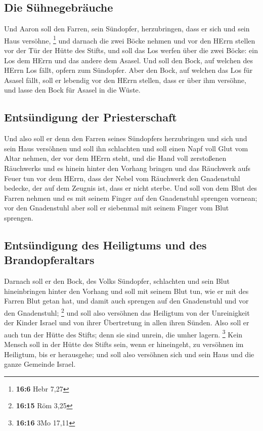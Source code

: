 \hypertarget{die-suxfchnegebruxe4uche}{%
\subsection{Die Sühnegebräuche}\label{die-suxfchnegebruxe4uche}}

 Und Aaron soll den Farren, sein Sündopfer, herzubringen,
dass er sich und sein Haus versöhne, \footnote{\textbf{16:6} Hebr 7,27}
 und darnach die zwei Böcke nehmen und vor den HErrn
stellen vor der Tür der Hütte des Stifts,  und soll das
Los werfen über die zwei Böcke: ein Los dem HErrn und das andere dem
Asasel.  Und soll den Bock, auf welchen des HErrn Los
fällt, opfern zum Sündopfer.  Aber den Bock, auf welchen
das Los für Asasel fällt, soll er lebendig vor den HErrn stellen, dass
er über ihm versöhne, und lasse den Bock für Asasel in die Wüste.

\hypertarget{entsuxfcndigung-der-priesterschaft}{%
\subsection{Entsündigung der
Priesterschaft}\label{entsuxfcndigung-der-priesterschaft}}

 Und also soll er denn den Farren seines Sündopfers
herzubringen und sich und sein Haus versöhnen und soll ihn schlachten
 und soll einen Napf voll Glut vom Altar nehmen, der vor
dem HErrn steht, und die Hand voll zerstoßenen Räuchwerks und es hinein
hinter den Vorhang bringen  und das Räuchwerk aufs Feuer
tun vor dem HErrn, dass der Nebel vom Räuchwerk den Gnadenstuhl bedecke,
der auf dem Zeugnis ist, dass er nicht sterbe.  Und soll
von dem Blut des Farren nehmen und es mit seinem Finger auf den
Gnadenstuhl sprengen vornean; vor den Gnadenstuhl aber soll er siebenmal
mit seinem Finger vom Blut sprengen.

\hypertarget{entsuxfcndigung-des-heiligtums-und-des-brandopferaltars}{%
\subsection{Entsündigung des Heiligtums und des
Brandopferaltars}\label{entsuxfcndigung-des-heiligtums-und-des-brandopferaltars}}

 Darnach soll er den Bock, des Volks Sündopfer,
schlachten und sein Blut hineinbringen hinter den Vorhang und soll mit
seinem Blut tun, wie er mit des Farren Blut getan hat, und damit auch
sprengen auf den Gnadenstuhl und vor den Gnadenstuhl; \footnote{\textbf{16:15}
  Röm 3,25}  und soll also versöhnen das Heiligtum von
der Unreinigkeit der Kinder Israel und von ihrer Übertretung in allen
ihren Sünden. Also soll er auch tun der Hütte des Stifts; denn sie sind
unrein, die umher lagern. \footnote{\textbf{16:16} 3Mo 17,11}
 Kein Mensch soll in der Hütte des Stifts sein, wenn er
hineingeht, zu versöhnen im Heiligtum, bis er herausgehe; und soll also
versöhnen sich und sein Haus und die ganze Gemeinde Israel.

